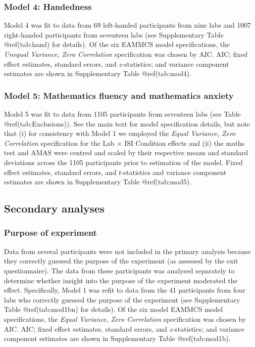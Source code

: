 \begin{appendix}
\subsubsection{Model 4: Handedness}\label{model-4-handedness}

Model 4 was fit to data from 69 left-handed participants from nine labs
and 1007 right-handed participants from seventeen labs (see
Supplementary Table @ref(tab:hand) for details). Of the six EAMMCS model
specifications, the \emph{Unequal Variance, Zero Correlation}
specification was chosen by AIC. AIC; fixed effect estimates, standard
errors, and \(z\)-statistics; and variance component estimates are shown
in Supplementary Table @ref(tab:mod4).

\subsubsection{Model 5: Mathematics fluency and mathematics
anxiety}\label{model-5-mathematics-fluency-and-mathematics-anxiety}

Model 5 was fit to data from 1105 participants from seventeen labs (see
Table @ref(tab:Exclusions)). See the main text for model specification
details, but note that (i) for consistency with Model 1 we employed the
\emph{Equal Variance, Zero Correlation} specification for the Lab
\(\times\) ISI Condition effects and (ii) the maths test and AMAS were
centred and scaled by their respective means and standard deviations
across the 1105 participants prior to estimation of the model. Fixed
effect estimates, standard errors, and \(t\)-statistics and variance
component estimates are shown in Supplementary Table @ref(tab:mod5).

\subsection{Secondary analyses}\label{secondary-analyses}

\subsubsection{Purpose of experiment}\label{purpose-of-experiment}

Data from several participants were not included in the primary analysis
because they correctly guessed the purpose of the experiment (as
assessed by the exit questionnaire). The data from these participants
was analysed separately to determine whether insight into the purpose of
the experiment moderated the effect. Specifically, Model 1 was refit to
data from the 41 participants from four labs who correctly guessed the
purpose of the experiment (see Supplementary Table @ref(tab:mod1bn) for
details). Of the six model EAMMCS model specifications, the \emph{Equal
Variance, Zero Correlation} specification was chosen by AIC. AIC; fixed
effect estimates, standard errors, and \(z\)-statistics; and variance
component estimates are shown in Supplementary Table @ref(tab:mod1b).


\end{appendix}
